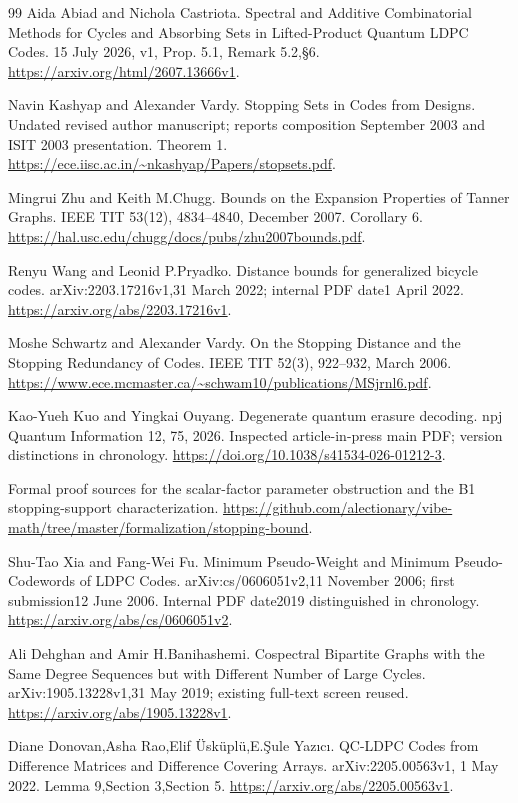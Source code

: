 \documentclass[11pt]{article}
\begin{document}
\begin{thebibliography}{99}
 Aida Abiad and Nichola Castriota. Spectral and Additive Combinatorial Methods for Cycles and Absorbing Sets in Lifted-Product Quantum LDPC Codes. 15 July 2026, v1, Prop. 5.1, Remark 5.2,§6. \url{https://arxiv.org/html/2607.13666v1}.

 Navin Kashyap and Alexander Vardy. Stopping Sets in Codes from Designs. Undated revised author manuscript; reports composition September 2003 and ISIT 2003 presentation. Theorem 1. \url{https://ece.iisc.ac.in/~nkashyap/Papers/stopsets.pdf}.

 Mingrui Zhu and Keith M.Chugg. Bounds on the Expansion Properties of Tanner Graphs. IEEE TIT 53(12), 4834--4840, December 2007. Corollary 6. \url{https://hal.usc.edu/chugg/docs/pubs/zhu2007bounds.pdf}.

 Renyu Wang and Leonid P.Pryadko. Distance bounds for generalized bicycle codes. arXiv:2203.17216v1,31 March 2022; internal PDF date1 April 2022. \url{https://arxiv.org/abs/2203.17216v1}.

 Moshe Schwartz and Alexander Vardy. On the Stopping Distance and the Stopping Redundancy of Codes. IEEE TIT 52(3), 922--932, March 2006. \url{https://www.ece.mcmaster.ca/~schwam10/publications/MSjrnl6.pdf}.

 Kao-Yueh Kuo and Yingkai Ouyang. Degenerate quantum erasure decoding. npj Quantum Information 12, 75, 2026. Inspected article-in-press main PDF; version distinctions in chronology. \url{https://doi.org/10.1038/s41534-026-01212-3}.

 Formal proof sources for the scalar-factor parameter obstruction and the B1 stopping-support characterization. \url{https://github.com/alectionary/vibe-math/tree/master/formalization/stopping-bound}.

 Shu-Tao Xia and Fang-Wei Fu. Minimum Pseudo-Weight and Minimum Pseudo-Codewords of LDPC Codes. arXiv:cs/0606051v2,11 November 2006; first submission12 June 2006. Internal PDF date2019 distinguished in chronology. \url{https://arxiv.org/abs/cs/0606051v2}.

 Ali Dehghan and Amir H.Banihashemi. Cospectral Bipartite Graphs with the Same Degree Sequences but with Different Number of Large Cycles. arXiv:1905.13228v1,31 May 2019; existing full-text screen reused. \url{https://arxiv.org/abs/1905.13228v1}.

 Diane Donovan,Asha Rao,Elif Üsküplü,E.\c{S}ule Yaz\i{}c\i{}. QC-LDPC Codes from Difference Matrices and Difference Covering Arrays. arXiv:2205.00563v1, 1 May 2022. Lemma 9,Section 3,Section 5. \url{https://arxiv.org/abs/2205.00563v1}.


\end{thebibliography}
\end{document}
